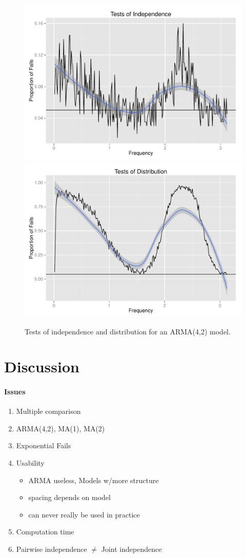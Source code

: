 \documentclass{article}\usepackage{graphicx, color}
\newenvironment{knitrout}{}{} %
\newcommand{\mj}[1]{{\color{blue} #1}}
\theoremstyle{plain}
\begin{document}
\begin{knitrout}
\color{fgcolor}\begin{figure}[H]

\includegraphics[width=.49\textwidth]{figure/tests-arma421} 
\includegraphics[width=.49\textwidth]{figure/tests-arma422} \caption[Tests of independence and distribution for an ARMA(4,2) model]{Tests of independence and distribution for an ARMA(4,2) model.\label{fig:tests-arma42}}
\end{figure}


\end{knitrout}



\section{Discussion}


\mj{
\paragraph{Issues}
\begin{enumerate}
  \item Multiple comparison 
  \item ARMA(4,2), MA(1), MA(2)
  \item Exponential Fails
  \item Usability 
  \begin{itemize}
    \item ARMA useless, Models w/more structure 
    \item spacing depends on model
    \item can never really be used in practice
  \end{itemize}
  \item Computation time
  \item Pairwise independence $\neq$ Joint independence
\end{enumerate}}


\printbibliography
\end{document}
